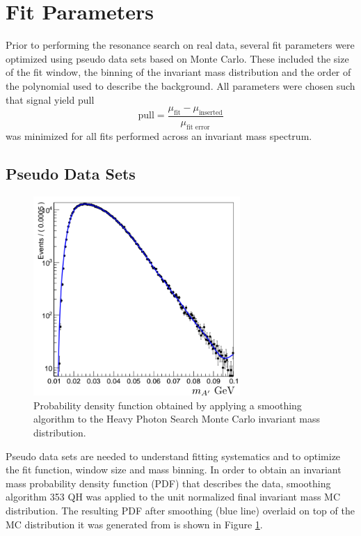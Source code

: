\section{Fit Parameters}

Prior to performing the resonance search on real data, several fit parameters 
were optimized using pseudo data sets based on Monte Carlo.  These included the size of the fit 
window, the binning of the invariant mass distribution and the order of 
the polynomial used to describe the background.  All parameters were chosen 
such that signal yield pull
\begin{equation}
    \text{pull} = \frac{\mu_{\text{fit}} - \mu_{\text{inserted}}}{\mu_{\text{fit error}}}
\end{equation}
was minimized for all fits performed across an invariant mass spectrum.

\subsection{Pseudo Data Sets}

\begin{figure}[ht]
    \centering
    \includegraphics[width=0.7\textwidth]{images/smooth_pdf.png}
    \caption{Probability density function obtained by applying a smoothing algorithm 
             to the Heavy Photon Search Monte Carlo invariant mass distribution.}
    \label{fig:smooth_pdf}
\end{figure}

Pseudo data sets are needed to understand fitting systematics and to optimize
the fit function, window size and mass binning.  In order to obtain an invariant
mass probability
density function (PDF) that describes the data, smoothing algorithm 353 QH 
\cite{Friedman:1974vj} was
applied to the unit normalized final invariant mass MC distribution.  The resulting
PDF after smoothing (blue line) overlaid on top of the MC distribution it was generated 
from is shown in Figure \ref{fig:smooth_pdf}.  

